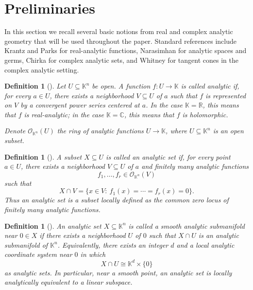 \documentclass[10pt,reqno]{amsart}
\theoremstyle{break-italic}
\theoremstyle{break-italic}
\theoremstyle{break-italic}
\theoremstyle{break-italic}
\theoremstyle{break-italic}
\theoremstyle{break-italic}
\theoremstyle{break-italic}
\theoremstyle{break-italic}
\theoremstyle{break-roman}
\newtheorem{definition}[satz]{Definition}
\theoremstyle{standard}
\theoremstyle{varthm-roman}
\theoremstyle{varthm-italic}
\theoremstyle{varthm-roman-break}
\theoremstyle{varthm-italic-break}
\theoremstyle{varthm-roman-no-punctuation}
\theoremstyle{varthm-italic-no-punctuation}
\numberwithin{equation}{section}
\begin{document}
\section{Preliminaries}\label{sec:preliminaries}\label{sec:preliminaries}

In this section we recall several basic notions from real and complex analytic geometry that will be used throughout the paper. Standard references include Krantz and Parks \cite{KrPa02} for real-analytic functions, Narasimhan \cite{Nara85} for analytic spaces and germs, Chirka \cite{Chirka89} for complex analytic sets, and Whitney \cite{Wh65a, Wh65b} for tangent cones in the complex analytic setting.

\begin{definition}[\cite{KrPa02,Chirka89}] \rm  
Let $U \subseteq \mathbb K^n$ be open. A function $f:U\to \mathbb K$ is called \emph{analytic} if, for every $a\in U$, there exists a neighborhood $V\subseteq U$ of $a$ such that $f$ is represented on $V$ by a convergent power series centered at $a$. In the case $\mathbb K=\mathbb R$, this means that $f$ is real-analytic; in the case $\mathbb K=\mathbb C$, this means that $f$ is holomorphic.

Denote $\mathcal O_{\mathbb K^n}(U)$ the ring of analytic functions $U \to \mathbb K$, where $U \subseteq \mathbb K^n$ is an open subset.
\end{definition}

\begin{definition}[\cite{Nara85,Chirka89}] \rm
A subset $X\subseteq U$ is called an \emph{analytic set} if, for every point $a\in U$, there exists a neighborhood $V\subseteq U$ of $a$ and finitely many analytic functions
\[
f_1,\dots,f_r \in \mathcal O_{\mathbb K^n}(V)
\]
such that
\[
X\cap V=\{x\in V:\ f_1(x)=\cdots=f_r(x)=0\}.
\]
Thus an analytic set is a subset locally defined as the common zero locus of finitely many analytic functions.
\end{definition} 

\begin{definition}[\cite{Nara85,Chirka89}]\rm 
An analytic set $X\subseteq \mathbb K^n$ is called a \emph{smooth analytic submanifold near $0\in X$} if there exists a neighborhood $U$ of $0$ such that $X\cap U$ is an analytic submanifold of $\mathbb K^n$. Equivalently, there exists an integer $d$ and a local analytic coordinate system near $0$ in which
\[
X\cap U \cong \mathbb K^d\times \{0\}
\]
as analytic sets. In particular, near a smooth point, an analytic set is locally analytically equivalent to a linear subspace. 
\end{definition}
\end{document}
